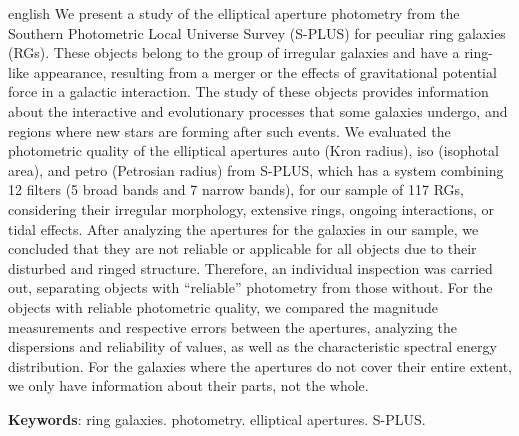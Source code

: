 \setlength{\absparsep}{18pt} %
\begin{resumo}[Abstract]
 \begin{otherlanguage*}{english}
  We present a study of the elliptical aperture photometry from the Southern Photometric Local Universe Survey (S-PLUS) for peculiar ring galaxies (RGs). These objects belong to the group of irregular galaxies and have a ring-like appearance, resulting from a merger or the effects of gravitational potential force in a galactic interaction. The study of these objects provides information about the interactive and evolutionary processes that some galaxies undergo, and regions where new stars are forming after such events. We evaluated the photometric quality of the elliptical apertures auto (Kron radius), iso (isophotal area), and petro (Petrosian radius) from S-PLUS, which has a system combining 12 filters (5 broad bands and 7 narrow bands), for our sample of 117 RGs, considering their irregular morphology, extensive rings, ongoing interactions, or tidal effects. After analyzing the apertures for the galaxies in our sample, we concluded that they are not reliable or applicable for all objects due to their disturbed and ringed structure. Therefore, an individual inspection was carried out, separating objects with ``reliable'' photometry from those without. For the objects with reliable photometric quality, we compared the magnitude measurements and respective errors between the apertures, analyzing the dispersions and reliability of values, as well as the characteristic spectral energy distribution. For the galaxies where the apertures do not cover their entire extent, we only have information about their parts, not the whole.

   \vspace{\onelineskip}
 
   \noindent 
   \textbf{Keywords}: ring galaxies. photometry. elliptical apertures. S-PLUS.
 \end{otherlanguage*}
\end{resumo}